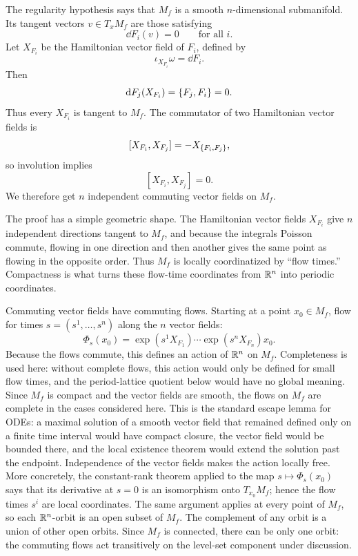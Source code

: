 The regularity hypothesis says that \(M_f\) is a smooth \(n\)-dimensional
submanifold. Its tangent vectors \(v\in T_xM_f\) are those satisfying
\[
  \dd F_i(v)=0
  \qquad\text{for all }i.
\]
Let \(X_{F_i}\) be the Hamiltonian vector field of \(F_i\), defined by
\[
  \iota_{X_{F_i}}\omega=\dd F_i.
\]
Then
\[
  \mathrm{d} F_j(X_{F_i})
  =
  \left\{F_j,F_i\right\}
  =
  0.
\]
Thus every \(X_{F_i}\) is tangent to \(M_f\). The commutator of two Hamiltonian
vector fields is
\[
  [X_{F_i},X_{F_j}]
  =
  -X_{\left\{F_i,F_j\right\}},
\]
so involution implies
\[
  [X_{F_i},X_{F_j}]=0.
\]
We therefore get \(n\) independent commuting vector fields on \(M_f\).

\begin{derivation}
The proof has a simple geometric shape. The Hamiltonian vector fields
\(X_{F_i}\) give \(n\) independent directions tangent to \(M_f\), and because
the integrals Poisson commute, flowing in one direction and then another gives
the same point as flowing in the opposite order. Thus \(M_f\) is locally
coordinatized by ``flow times.'' Compactness is what turns these flow-time
coordinates from \(\mathbb{R}^n\) into periodic coordinates.

Commuting vector fields have commuting flows. Starting at a point \(x_0\in
M_f\), flow for times \(s=(s^1,\ldots,s^n)\) along the \(n\) vector fields:
\[
  \Phi_s(x_0)
  =
  \exp(s^1X_{F_1})\cdots\exp(s^nX_{F_n})x_0.
\]
Because the flows commute, this defines an action of \(\mathbb{R}^n\) on \(M_f\).
Completeness is used here: without complete flows, this action would
only be defined for small flow times, and the period-lattice quotient below
would have no global meaning. Since \(M_f\) is compact and the vector fields
are smooth, the flows on \(M_f\) are complete in the cases considered here.
This is the standard escape lemma for ODEs: a maximal solution of a smooth
vector field that remained defined only on a finite time interval would have
compact closure, the vector field would be bounded there, and the local
existence theorem would extend the solution past the endpoint.
Independence of the vector fields makes the action locally free. More
concretely, the constant-rank theorem applied to the map
\(s\mapsto\Phi_s(x_0)\) says that its derivative at \(s=0\) is an isomorphism
onto \(T_{x_0}M_f\); hence the flow times \(s^i\) are local coordinates. The
same argument applies at every point of \(M_f\), so each \(\mathbb{R}^n\)-orbit is an
open subset of \(M_f\). The complement of any orbit is a union of other open
orbits. Since \(M_f\) is connected, there can be only one orbit: the commuting
flows act transitively on the level-set component under discussion.


\end{derivation}
